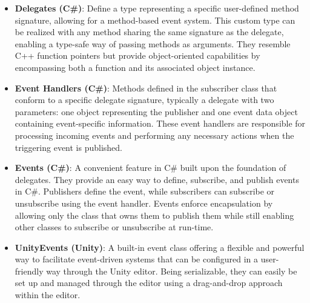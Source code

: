 \begin{itemize}
    \item \textbf{Delegates (C\#)}: Define a type representing a specific user-defined method signature, allowing for a method-based event system\cite{microsoft-csharp-delegates}. This custom type can be realized with any method sharing the same signature as the delegate, enabling a type-safe way of passing methods as arguments. They resemble C++ function pointers but provide object-oriented capabilities by encompassing both a function and its associated object instance.
    
    \item \textbf{Event Handlers (C\#)}: Methods defined in the subscriber class that conform to a specific delegate signature\cite{microsoft-eventhandler}, typically a delegate with two parameters: one object representing the publisher and one event data object containing event-specific information. These event handlers are responsible for processing incoming events and performing any necessary actions when the triggering event is published.
    
    \item \textbf{Events (C\#)}: A convenient feature in C\# built upon the foundation of delegates\cite{microsoft-csharp-events}. They provide an easy way to define, subscribe, and publish events in C\#. Publishers define the event, while subscribers can subscribe or unsubscribe using the event handler. Events enforce encapsulation by allowing only the class that owns them to publish them while still enabling other classes to subscribe or unsubscribe at run-time.
    
    \item \textbf{UnityEvents (Unity)}: A built-in event class offering a flexible and powerful way to facilitate event-driven systems that can be configured in a user-friendly way through the Unity editor\cite{unity-unityevents}. Being serializable, they can easily be set up and managed through the editor using a drag-and-drop approach within the editor.
\end{itemize}

